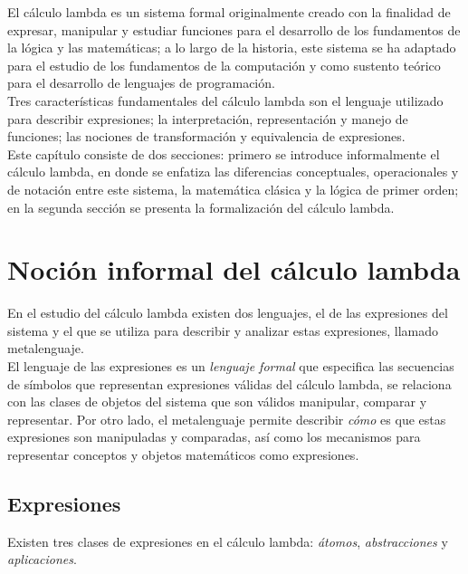 El cálculo lambda es un sistema formal originalmente creado con la finalidad de
expresar, manipular y estudiar funciones para el desarrollo de los fundamentos
de la lógica y las matemáticas; a lo largo de la historia, este sistema se ha
adaptado para el estudio de los fundamentos de la computación y como sustento
teórico para el desarrollo de lenguajes de programación. \\

Tres características fundamentales del cálculo lambda son el lenguaje utilizado
para describir expresiones; la interpretación, representación y manejo de
funciones; las nociones de transformación y equivalencia de expresiones. \\

Este capítulo consiste de dos secciones: primero se introduce informalmente el
cálculo lambda, en donde se enfatiza las diferencias conceptuales, operacionales
y de notación entre este sistema, la matemática clásica y la lógica de primer
orden; en la segunda sección se presenta la formalización del cálculo lambda. \\

\section{Noción informal del cálculo lambda}

En el estudio del cálculo lambda existen dos lenguajes, el de las expresiones
del sistema y el que se utiliza para describir y analizar estas expresiones,
llamado metalenguaje. \\

El lenguaje de las expresiones es un \emph{lenguaje formal} que especifica las
secuencias de símbolos que representan expresiones válidas del cálculo lambda,
se relaciona con las clases de objetos del sistema que son válidos manipular,
comparar y representar. Por otro lado, el metalenguaje permite describir
\emph{cómo} es que estas expresiones son manipuladas y comparadas, así como los
mecanismos para representar conceptos y objetos matemáticos como expresiones. \\

\subsection{Expresiones}

Existen tres clases de expresiones en el cálculo lambda: \emph{átomos},
\emph{abstracciones} y \emph{aplicaciones}. \\

